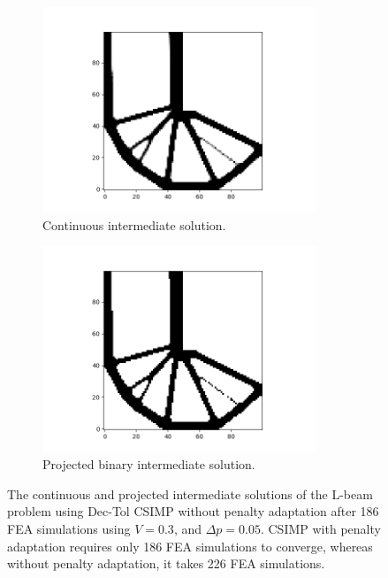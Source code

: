   \begin{figure}
    \centering
    \begin{subfigure}[t]{0.45\textwidth}
      \includegraphics[width=0.9\textwidth]{images/adaptive_csimp/lbeam_dec_tol_csimp_intermediate_03_001_80.png}
      \caption{Continuous intermediate solution.}
      \label{fig:cont_intermediate_solution_lbeam}
    \end{subfigure} \hfill
    \begin{subfigure}[t]{0.45\textwidth}
      \includegraphics[width=0.9\textwidth]{images/adaptive_csimp/lbeam_dec_tol_csimp_intermediate_binary_03_001_80.png}
      \caption{Projected binary intermediate solution.}
      \label{fig:bin_intermediate_solution_lbeam}
    \end{subfigure}
    \caption{The continuous and projected intermediate solutions of the L-beam problem using Dec-Tol CSIMP without penalty adaptation after 186 FEA simulations using $V = 0.3$, and $\Delta p = 0.05$. CSIMP with penalty adaptation requires only 186 FEA simulations to converge, whereas without penalty adaptation, it takes 226 FEA simulations.}
    \label{fig:intermediate_solution_lbeam}
  \end{figure}


